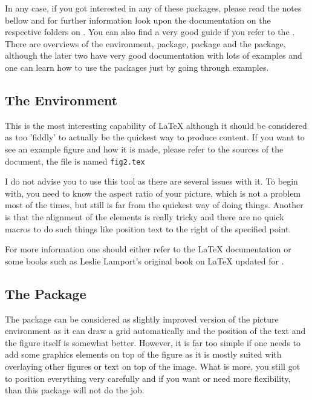 \documentclass[
]{scrartcl}
\begin{document}
%
In any case, if you got interested in any of these packages, please read the
    notes bellow and for further information look upon the documentation on the
    respective folders on .
%
You can also find a very good guide if you refer to the 
    .
%
There are overviews of the  environment,  package,
     package and the  package, although the later two
    have very good documentation with lots of examples and one can learn how to
    use the packages just by going through examples.

%
\subsection{The  Environment}

%
This is the most interesting capability of \LaTeX{} although it should be
    considered as too 'fiddly' to actually be the quickest way to produce
    content.
%
If you want to see an example figure and how it is made, please refer to the
    sources of the document, the file is named \texttt{fig2.tex}

%
I do not advise you to use this tool as there are several issues with it.
%
To begin with, you need to know the aspect ratio of your picture, which is not a
    problem most of the times, but still is far from the quickest way of doing
    things.
%
Another is that the alignment of the elements is really tricky and there are no
    quick macros to do such things like position text to the right of the
    specified point.

%
For more information one should either refer to the \LaTeX{} documentation or
    some books such as Leslie Lamport's original book on \LaTeX{} updated for
    \LaTeXe{}.

%
\subsection{The  Package}

%
The  package can be considered as slightly improved version of the
    picture environment as it can draw a grid automatically and the position of
    the text and the figure itself is somewhat better.
%
However, it is far too simple if one needs to add some graphics elements on top
    of the figure as it is mostly suited with overlaying other figures or text
    on top of the image.
%
What is more, you still got to position everything very carefully and if you
    want or need more flexibility, than this package will not do the job.
\end{document}
